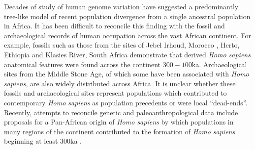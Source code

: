 \documentclass[]{article}
\begin{document}
Decades of study of human genome variation have suggested a predominantly
tree-like model of recent population divergence from a single ancestral
population in Africa. It has been difficult to reconcile this finding with the
fossil and archaeological records of human occupation across the vast African
continent. For example, fossils such as those from the sites of Jebel Irhoud,
Morocco \citep{Hublin2017-cq}, Herto, Ethiopia \citep{White2003-bk} and Klasies
River, South Africa \citep{Deacon1995-rx} demonstrate that derived \emph{Homo
sapiens} anatomical features were found across the continent
$300-100$ka. Archaeological sites from the Middle Stone Age, of which some have
been associated with \emph{Homo sapiens}, are also widely distributed across
Africa. It is unclear whether these fossils and archaeological sites represent
populations which contributed to contemporary \emph{Homo sapiens} as population
precedents or were local ``dead-ends''. Recently, attempts to reconcile genetic
and paleoanthropological data include proposals for a Pan-African origin of
\emph{Homo sapiens} by which populations in many regions of the continent
contributed to the formation of \emph{Homo sapiens} beginning at least $300$ka
\citep{Stringer2016-mj,Scerri2018-nl,Scerri2019-xg}.
\end{document}
